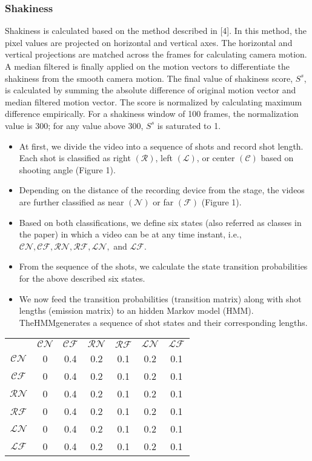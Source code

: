 \documentclass{sig-alternate-05-2015}
\begin{document}
\subsubsection{Shakiness}

Shakiness is calculated based on the method described in [4].
In this method, the pixel values are projected on horizontal and
vertical axes. The horizontal and vertical projections are matched
across the frames for calculating camera motion. A median filtered
is finally applied on the motion vectors to differentiate the shakiness
from the smooth camera motion. The final value of shakiness
score, $S^s$, is calculated by summing the absolute difference of original
motion vector and median filtered motion vector. The score is
normalized by calculating maximum difference empirically. For a
shakiness window of 100 frames, the normalization value is 300;
for any value above 300, $S^s$ is saturated to 1.

\begin{itemize}
\item At first, we divide the video into a sequence of shots and
record shot length.
Each shot is classified as right $\mathcal{(R)}$, left $\mathcal{(L)}$, or center $\mathcal{(C)}$ based on shooting angle (Figure 1).
\item Depending on the distance of the recording device from the
stage, the videos are further classified as near $\mathcal{(N)}$ or far $\mathcal{(F)}$ (Figure 1).
\item Based on both classifications, we define six states (also referred
as classes in the paper) in which a video can be at any
time instant, i.e., $\mathcal{CN, CF, RN, RF, LN,}$ and $\mathcal{LF}$.
\item From the sequence of the shots, we calculate the state transition
probabilities for the above described six states.
\item We now feed the transition probabilities (transition matrix)
along with shot lengths (emission matrix) to an hidden Markov
model (HMM). TheHMMgenerates a sequence of shot states
and their corresponding lengths.
\end{itemize}

\begin{tabular}{ccccccc}
& $\mathcal{CN}$ & $\mathcal{CF}$ & $\mathcal{RN}$ & $\mathcal{RF}$ & $\mathcal{LN}$ & $\mathcal{LF}$\\
$\mathcal{CN}$ & 0 & 0.4 & 0.2 & 0.1 & 0.2 & 0.1\\
$\mathcal{CF}$ & 0 & 0.4 & 0.2 & 0.1 & 0.2 & 0.1\\
$\mathcal{RN}$ & 0 & 0.4 & 0.2 & 0.1 & 0.2 & 0.1\\
$\mathcal{RF}$ & 0 & 0.4 & 0.2 & 0.1 & 0.2 & 0.1\\
$\mathcal{LN}$ & 0 & 0.4 & 0.2 & 0.1 & 0.2 & 0.1\\
$\mathcal{LF}$ & 0 & 0.4 & 0.2 & 0.1 & 0.2 & 0.1\\
\end{tabular}
\end{document}
